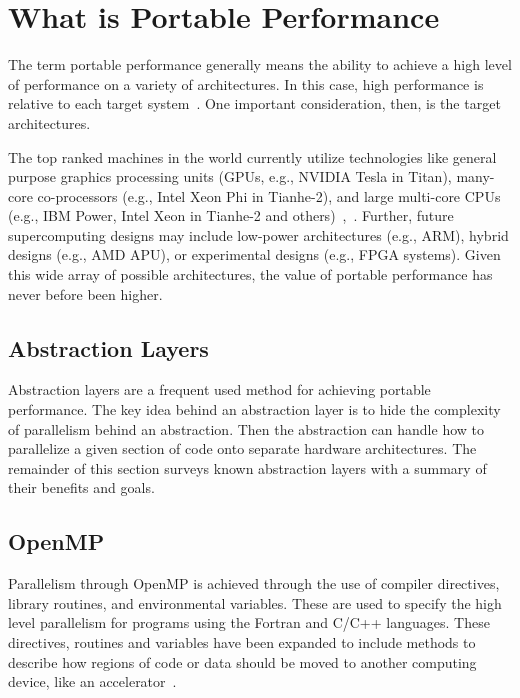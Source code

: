 \section{\textbf{What is Portable Performance}}
\label{sec:whatispp}

The term portable performance generally means the ability to achieve a high level of performance on a variety of architectures.
%
In this case, high performance is relative to each target system~\cite{michaelwolfe2016}.
%
One important consideration, then, is the target architectures.
%

%
The top ranked machines in the world currently utilize technologies like general purpose graphics processing units (GPUs, e.g., NVIDIA Tesla in Titan), many-core co-processors (e.g., Intel Xeon Phi in Tianhe-2), and large multi-core CPUs (e.g., IBM Power, Intel Xeon in Tianhe-2 and others)~\cite{michaelwolfe2016},~\cite{top500thelist2016}. 
%
Further, future supercomputing designs may include low-power architectures (e.g., ARM), hybrid designs (e.g., AMD APU), or experimental designs (e.g., FPGA systems). 
%
Given this wide array of possible architectures, the value of portable performance has never before been higher.
%

\subsection{ \textbf{Abstraction Layers}}

Abstraction layers are a frequent used method for achieving portable performance.
%
The key idea behind an abstraction layer is to hide the complexity of parallelism behind an abstraction.
%
Then the abstraction can handle how to parallelize a given section of code onto separate hardware architectures.
%
The remainder of this section surveys known abstraction layers with a summary of their benefits and goals.

\subsection*{\textbf{OpenMP}}

Parallelism through OpenMP is achieved through the use of compiler directives, library routines, and environmental variables.
%
These are used to specify the high level parallelism for programs using the Fortran and C/C++ languages.
%
These directives, routines and variables have been expanded to include methods to describe how regions of code or data should be moved to another computing device, like an accelerator~\cite{openmp}.

